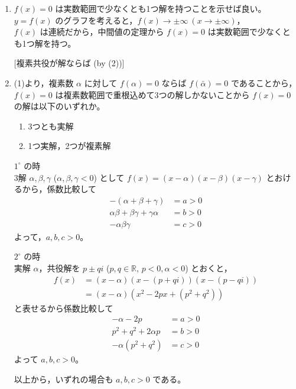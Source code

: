 \documentclass[../main.tex]{subfiles}
\begin{document}
\noindent
[\textbf{解}]
\begin{enumerate}
  \item[(1)] $f(x)=0$ は実数範囲で少なくとも1つ解を持つことを示せば良い。\\
    $y=f(x)$ のグラフを考えると，$f(x) \to \pm \infty \ (x \to \pm \infty)$，\\
    $f(x)$ は連続だから，中間値の定理から $f(x)=0$ は実数範囲で少なくとも1つ解を持つ。
    \begin{center}
      [複素共役が解ならば (by (2))]
    \end{center}

  \item[(2)] (1)より，複素数 $\alpha$ に対して $f(\alpha)=0$ ならば $f(\bar{\alpha})=0$ であることから，$f(x)=0$ は複素数範囲で重根込めて3つの解しかないことから $f(x)=0$ の解は以下のいずれか。
    \begin{enumerate}
      \item[$1^\circ$] 3つとも実解
      \item[$2^\circ$] 1つ実解，2つが複素解
    \end{enumerate}

    \vspace{0.5em}
    \noindent
    $1^\circ$ の時\\
    3解 $\alpha, \beta, \gamma$ ($\alpha, \beta, \gamma < 0$) として $f(x)=(x-\alpha)(x-\beta)(x-\gamma)$ とおけるから，係数比較して
    \[
      \begin{aligned}
        -(\alpha+\beta+\gamma) &= a > 0 \\
        \alpha\beta+\beta\gamma+\gamma\alpha &= b > 0 \\
        -\alpha\beta\gamma &= c > 0
      \end{aligned}
    \]
    よって，$a, b, c > 0$。

    \vspace{0.5em}
    \noindent
    $2^\circ$ の時\\
    実解 $\alpha$，共役解を $p \pm qi$ ($p, q \in \mathbb{R}$, $p < 0, \alpha < 0$) とおくと，
    \[
      \begin{aligned}
        f(x) &= (x-\alpha)(x-(p+qi))(x-(p-qi)) \\
        &= (x-\alpha)(x^2 - 2px + (p^2+q^2))
      \end{aligned}
    \]
    と表せるから係数比較して
    \[
      \begin{aligned}
        -\alpha - 2p &= a > 0 \\
        p^2+q^2+2\alpha p &= b > 0 \\
        -\alpha(p^2+q^2) &= c > 0
      \end{aligned}
    \]
    よって $a, b, c > 0$。

    \vspace{0.5em}
    \noindent
    以上から，いずれの場合も $a, b, c > 0$ である。
\end{enumerate}
\end{document}
